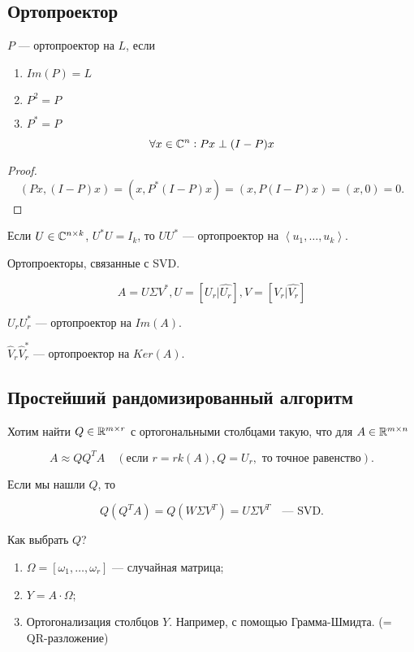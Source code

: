 \subsection{Ортопроектор}

\begin{definition}
    $P$ --- ортопроектор на $L$, если

    \begin{enumerate}
        \item $Im(P) = L$
        \item $P^2 = P$
        \item $P^* = P$
    \end{enumerate}
\end{definition}

\begin{point}
    \[
        \forall x \in \mathbb{C}^n: P x \perp (I - P) x
    \]
\end{point}

\begin{proof}
    \[
        (P x, (I - P) x) = (x, P^* (I - P) x) = (x, P (I - P) x) = (x, 0) = 0.
    \]
\end{proof}

\begin{point}
    Если $U \in \mathbb{C}^{n \times k}$, $U^* U = I_k$, то $U U^*$ --- ортопроектор
    на $\left< u_1, \dots, u_k \right>$.
\end{point}

Ортопроекторы, связанные с SVD.

\[
    A = U \Sigma V^*, U = [U_r | \hat{U_r}], V = [V_r | \hat{V_r}]
\]

$U_r U_r^*$ --- ортопроектор на $Im(A)$.

$\hat{V}_r \hat{V}_r^*$ --- ортопроектор на $Ker(A)$.

\subsection{Простейший рандомизированный алгоритм}

Хотим найти $Q \in \mathbb{R}^{m \times r}$ с ортогональными столбцами такую, что для
$A \in \mathbb{R}^{m \times n}$

\[
    A \approx Q Q^T A \quad (\text{если } r = rk(A), Q = U_r, \text{ то
    точное равенство}).
\]

Если мы нашли $Q$, то

\[
    Q (Q^T A) = Q (W \Sigma V^T) = U \Sigma V^T \quad \text{--- SVD.}
\]

Как выбрать $Q$?

\begin{enumerate}
    \item $\Omega = [\omega_1, \dots, \omega_r]$ --- случайная матрица;
    \item $Y = A \cdot \Omega$;
    \item Ортогонализация столбцов $Y$. Например, с помощью Грамма-Шмидта.
        (= QR-разложение)
\end{enumerate}


